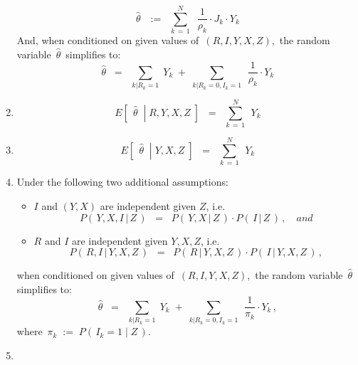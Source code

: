 \begin{proposition}
\begin{enumerate}
\begin{equation*}
	\widehat{\theta}
	\,\;\; := \;\;
		\overset{N}{\underset{k\,=\,1}{\sum}}\;\;
		\dfrac{1}{\rho_{k}} \cdot J_{k} \cdot Y_{k}
	\end{equation*}
	And, when conditioned on given values of \,$(R,I,Y,X,Z)$,\,
	the random variable \,$\widehat{\theta}$\, simplifies to:
	\begin{equation*}
	\widehat{\theta}
	\;\; = \;\;
		\underset{k\vert R_{k}=1}{\sum}\; Y_{k}
		\; + \;
		\underset{k\vert R_{k}=0,I_{k}=1}{\sum}\;\, \dfrac{1}{\rho_{k}}\cdot Y_{k}
	\end{equation*}
\item
	\begin{equation*}
	E\!\left[\;\,\left.\widehat{\theta}\;\;\right\vert\;R,Y,X,Z\;\right]
	\;\; = \;\;
		\overset{N}{\underset{k\,=\,1}{\sum}}\;\, Y_{k}	
	\end{equation*}
\item
	\begin{equation*}
	E\!\left[\;\,\left.\widehat{\theta}\;\;\right\vert\;Y,X,Z\;\right]
	\;\; = \;\;
		\overset{N}{\underset{k\,=\,1}{\sum}}\;\, Y_{k}	
	\end{equation*}
\item
	Under the following two additional assumptions:
	\begin{itemize}
	\item
		$I$ and $(Y,X)$ are independent given $Z$, i.e.
		\begin{equation*}
		P\!\left(\,Y,X,I\,\vert\,Z\,\right)
		\;\; = \;\;
			P\!\left(\,Y,X\,\vert\,Z\,\right)
			\cdot
			P\!\left(\,I\,\vert\,Z\,\right)\,,
			\quad
			\textit{and}
		\end{equation*}
	\item
		$R$ and $I$ are independent given $Y,X,Z$, i.e.
		\begin{equation*}
		P\!\left(\,R,I\,\vert\,Y,X,Z\,\right)
		\;\; = \;\;
			P\!\left(\,R\,\vert\,Y,X,Z\,\right)
			\cdot
			P\!\left(\,I\,\vert\,Y,X,Z\,\right)\,,
		\end{equation*}	
	\end{itemize}
	when conditioned on given values of \,$(R,I,Y,X,Z)$,\, the random variable \,$\widehat{\theta}$\, simplifies to:
	\begin{equation*}
	\widehat{\theta}
	\;\; = \;\;
		\underset{k\vert R_{k}=1}{\sum}\; Y_{k}
		\; + \;
		\underset{k\vert R_{k}=0,I_{k}=1}{\sum}\;\, \dfrac{1}{\pi_{k}}\cdot Y_{k}\,,
	\end{equation*}
	where \,$\pi_{k} \; := \; P(\,I_{k}=1\;\vert\;Z\,)$.
\item

\end{enumerate}
\end{proposition}
